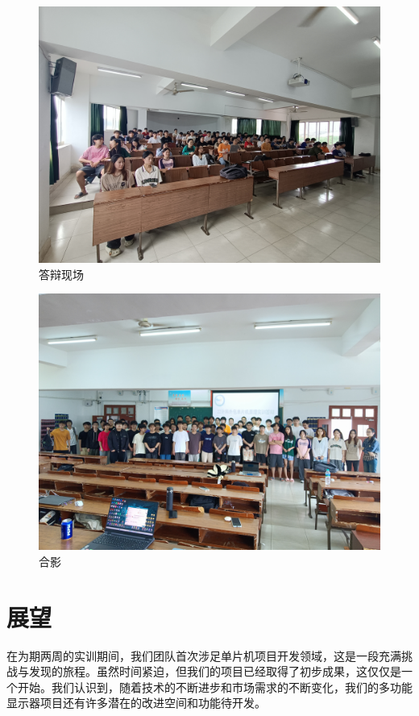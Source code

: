 \documentclass{textreportclass}  %
\begin{document}
	\begin{figure}[htbp]
		\centering
		\includegraphics[scale=0.1]{Fig/合影2.jpg}
		\caption{答辩现场}\label{Fig.45}
	\end{figure}
	
	\begin{figure}[htbp]
		\centering
		\includegraphics[scale=0.1]{Fig/合影1.jpg}
		\caption{合影}\label{Fig.46}
	\end{figure}


\section{展望}					 		  %
在为期两周的实训期间，我们团队首次涉足单片机项目开发领域，这是一段充满挑战与发现的旅程。虽然时间紧迫，但我们的项目已经取得了初步成果，这仅仅是一个开始。我们认识到，随着技术的不断进步和市场需求的不断变化，我们的多功能显示器项目还有许多潜在的改进空间和功能待开发。
\end{document}

